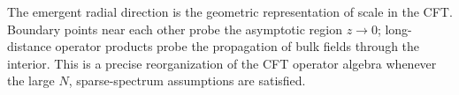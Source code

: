 The emergent radial direction is the geometric representation of scale in
the CFT.  Boundary points near each other probe the asymptotic region
\(z\to0\); long-distance operator products probe the propagation of bulk
fields through the interior.  This is a precise reorganization of the CFT
operator algebra whenever the large \(N\), sparse-spectrum assumptions are
satisfied.

